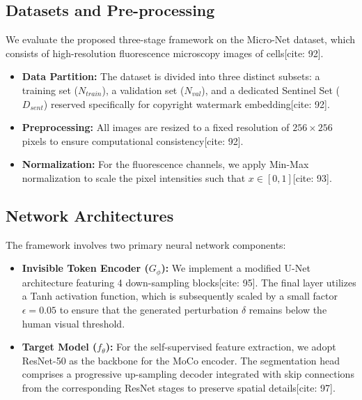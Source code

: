 \documentclass[10pt,twocolumn,letterpaper]{article}
\begin{document}
\subsection{Datasets and Pre-processing}
We evaluate the proposed three-stage framework on the Micro-Net dataset, which consists of high-resolution fluorescence microscopy images of cells[cite: 92]. 
\begin{itemize}
    \item \textbf{Data Partition:} The dataset is divided into three distinct subsets: a training set ($N_{train}$), a validation set ($N_{val}$), and a dedicated Sentinel Set ($D_{sent}$) reserved specifically for copyright watermark embedding[cite: 92].
    \item \textbf{Preprocessing:} All images are resized to a fixed resolution of $256 \times 256$ pixels to ensure computational consistency[cite: 92]. 
    \item \textbf{Normalization:} For the fluorescence channels, we apply Min-Max normalization to scale the pixel intensities such that $x \in [0, 1]$[cite: 93].
\end{itemize}

\subsection{Network Architectures}
The framework involves two primary neural network components:
\begin{itemize}
    \item \textbf{Invisible Token Encoder ($G_\phi$):} We implement a modified U-Net architecture featuring 4 down-sampling blocks[cite: 95]. The final layer utilizes a Tanh activation function, which is subsequently scaled by a small factor $\epsilon = 0.05$ to ensure that the generated perturbation $\delta$ remains below the human visual threshold.
    \item \textbf{Target Model ($f_\theta$):} For the self-supervised feature extraction, we adopt ResNet-50 as the backbone for the MoCo encoder. The segmentation head comprises a progressive up-sampling decoder integrated with skip connections from the corresponding ResNet stages to preserve spatial details[cite: 97].
\end{itemize}
\end{document}
